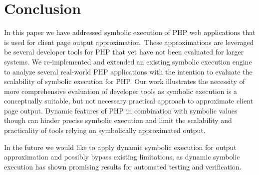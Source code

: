 \documentclass[sigconf, preprint]{acmart}
\begin{document}
\section{Conclusion}
In this paper we have addressed symbolic execution of PHP web applications that
is used for client page output approximation. These approximations are leveraged
be several developer tools for PHP that yet have not been evaluated for larger
systems. We re-implemented and extended an existing symbolic execution engine
to analyze several real-world PHP applications with the intention to evaluate
the scalability of symbolic execution for PHP. Our work illustrates the
necessity of more comprehensive evaluation of developer tools as
symbolic execution is a conceptually suitable, but not necessary practical
approach to approximate client page output. Dynamic features of PHP in
combination with symbolic values though can hinder precise symbolic execution
and limit the scalability and practicality of tools relying on symbolically
approximated output.

In the future we would like to apply dynamic symbolic execution for output
approximation and possibly bypass existing limitations, as dynamic symbolic
execution has shown promising results for automated testing and verification.


 
\end{document}
